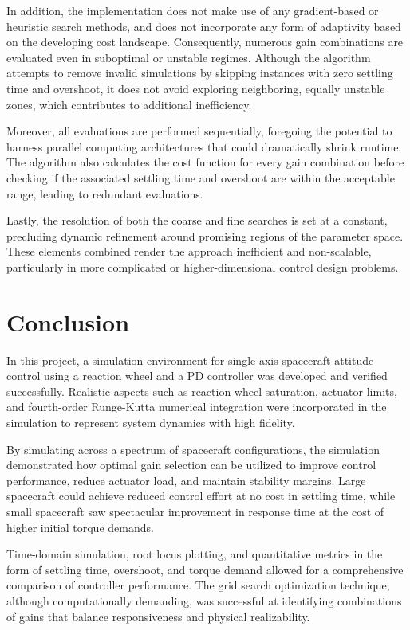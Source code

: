 \documentclass{ifacconf}
\begin{document}
In addition, the implementation does not make use of any gradient-based or heuristic search methods, and does not incorporate any form of adaptivity based on the developing cost landscape. Consequently, numerous gain combinations are evaluated even in suboptimal or unstable regimes. Although the algorithm attempts to remove invalid simulations by skipping instances with zero settling time and overshoot, it does not avoid exploring neighboring, equally unstable zones, which contributes to additional inefficiency.

Moreover, all evaluations are performed sequentially, foregoing the potential to harness parallel computing architectures that could dramatically shrink runtime. The algorithm also calculates the cost function for every gain combination before checking if the associated settling time and overshoot are within the acceptable range, leading to redundant evaluations.

Lastly, the resolution of both the coarse and fine searches is set at a constant, precluding dynamic refinement around promising regions of the parameter space. These elements combined render the approach inefficient and non-scalable, particularly in more complicated or higher-dimensional control design problems.



\section{Conclusion}

In this project, a simulation environment for single-axis spacecraft attitude control using a reaction wheel and a PD controller was developed and verified successfully. Realistic aspects such as reaction wheel saturation, actuator limits, and fourth-order Runge-Kutta numerical integration were incorporated in the simulation to represent system dynamics with high fidelity.

By simulating across a spectrum of spacecraft configurations, the simulation demonstrated how optimal gain selection can be utilized to improve control performance, reduce actuator load, and maintain stability margins. Large spacecraft could achieve reduced control effort at no cost in settling time, while small spacecraft saw spectacular improvement in response time at the cost of higher initial torque demands.

Time-domain simulation, root locus plotting, and quantitative metrics in the form of settling time, overshoot, and torque demand allowed for a comprehensive comparison of controller performance. The grid search optimization technique, although computationally demanding, was successful at identifying combinations of gains that balance responsiveness and physical realizability.
\end{document}
